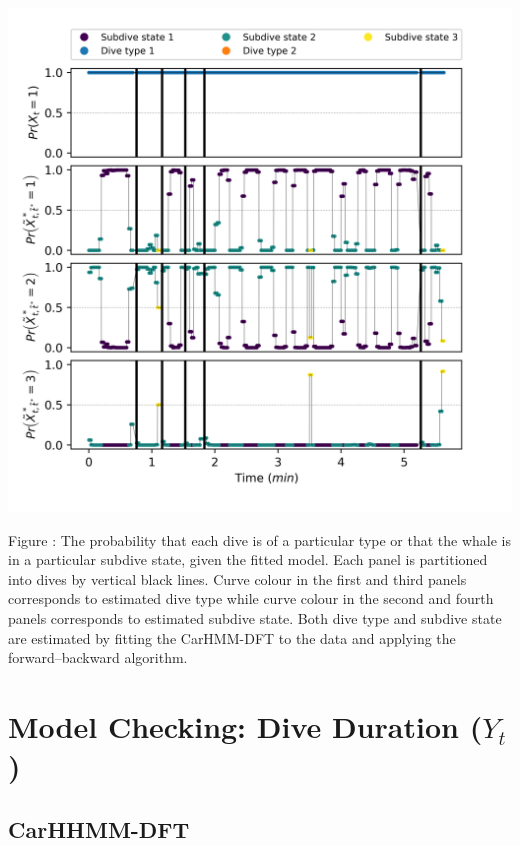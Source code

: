 \documentclass{article}
\begin{document}
        \begin{center}
        \includegraphics[width=6in]{../Plots/2019/20190902-182840-CATs_OB_1_0_267_CarHMM_decoded_states.png}
        \end{center}
        
        \noindent Figure : The probability that each dive is of a particular type or that the whale is in a particular subdive state, given the fitted model. Each panel is partitioned into dives by vertical black lines. Curve colour in the first and third panels corresponds to estimated dive type while curve colour in the second and fourth panels corresponds to estimated subdive state. Both dive type and subdive state are estimated by fitting the CarHMM-DFT to the data and applying the forward--backward algorithm.
        \addtocounter{fignum}{1}
        
    \newpage
    \section{Model Checking: Dive Duration ($Y_t$)}
    
        \subsection{CarHHMM-DFT}
        
\end{document}
